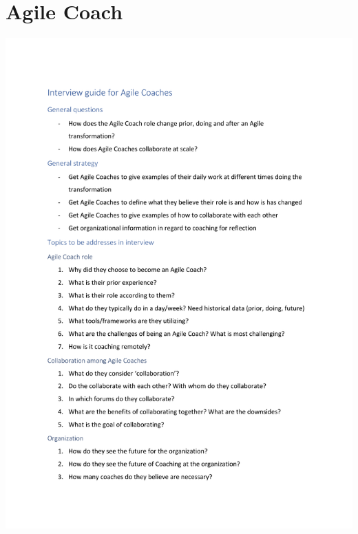 \documentclass[11pt,a4paper]{report}
\begin{document}
\section{Agile Coach}
\includegraphics[scale=0.99, page=1]{InterviewTemplates/acInterview.pdf}
\newpage
\end{document}
